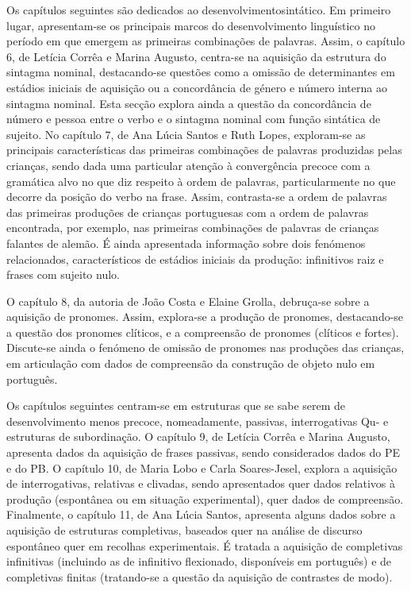 \begin{refsection}
Os capítulos seguintes são dedicados ao desenvolvimento\largerpage sintático. Em primeiro lugar, apresentam-se os principais marcos do desenvolvimento linguístico no período em que emergem as primeiras combinações de palavras. Assim, o capítulo 6, de Letícia Corrêa e Marina Augusto, centra-se na aquisição da estrutura do sintagma nominal, destacando-se questões como a omissão de determinantes em estádios iniciais de aquisição ou a concordância de género e número interna ao sintagma nominal. Esta secção explora ainda a questão da concordância de número e pessoa entre o verbo e o sintagma nominal com função sintática de sujeito. No capítulo 7, de Ana Lúcia Santos e Ruth Lopes, exploram-se as principais características das primeiras combinações de palavras produzidas pelas crianças, sendo dada uma particular atenção à convergência precoce com a gramática alvo no que diz respeito à ordem de palavras, particularmente no que decorre da posição do verbo na frase. Assim, contrasta-se a ordem de palavras das primeiras produções de crianças portuguesas com a ordem de palavras encontrada, por exemplo, nas primeiras combinações de palavras de crianças falantes de alemão. É ainda apresentada informação sobre dois fenómenos relacionados, característicos de estádios iniciais da produção: infinitivos raiz e frases com sujeito nulo.

O capítulo 8, da autoria de João Costa e Elaine Grolla, debruça-se sobre a aquisição de pronomes. Assim, explora-se a produção de pronomes, destacando-se a questão dos pronomes clíticos, e a compreensão de pronomes (clíticos e fortes). Discute-se ainda o fenómeno de omissão de pronomes nas produções das crianças, em articulação com dados de compreensão da construção de objeto nulo em português.

Os capítulos seguintes centram-se em estruturas que se sabe serem de desenvolvimento menos precoce, nomeadamente, passivas, interrogativas Qu- e estruturas de subordinação. O capítulo 9, de Letícia Corrêa e Marina Augusto, apresenta dados da aquisição de frases passivas, sendo considerados dados do PE e do PB. O capítulo 10, de Maria Lobo e Carla Soares-Jesel, explora a aquisição de interrogativas, relativas e clivadas, sendo apresentados quer dados relativos à produção (espontânea ou em situação experimental), quer dados de compreensão. Finalmente, o capítulo 11, de Ana Lúcia Santos, apresenta alguns dados sobre a aquisição de estruturas completivas, baseados quer na análise de discurso espontâneo quer em recolhas experimentais. É tratada a aquisição de completivas infinitivas (incluindo as de infinitivo flexionado, disponíveis em português) e de completivas finitas (tratando-se a questão da aquisição de contrastes de modo). 


\end{refsection}
